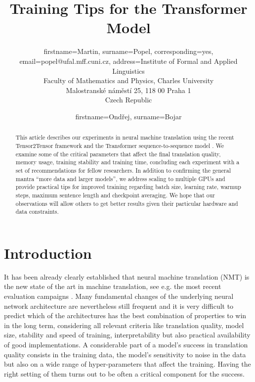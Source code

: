 \documentclass{pbmlarxiv} \pdfoutput=1
\def\parcite#1{\cite{#1}}
\begin{document}
\title{Training Tips for the Transformer Model}

\author{
  firstname=Martin,
  surname=Popel,
  corresponding=yes,
  email={popel@ufal.mff.cuni.cz},
  address={Institute of Formal and Applied Linguistics\\
           Faculty of Mathematics and Physics, Charles University\\
           Malostranské náměstí 25,
           118 00 Praha 1\\
           Czech Republic}
}
\author{firstname=Ondřej, surname=Bojar}

\PBMLmaketitle

\begin{abstract}
This article describes our experiments in neural machine translation
 using the recent Tensor2Tensor framework
 and the Transformer sequence-to-sequence model \citep{vaswani-et-al:2017}. 
We examine some of the critical parameters
 that affect the final translation quality, memory usage, training stability and training time,
 concluding each experiment with a set of recommendations for fellow researchers.
In addition to confirming the general mantra ``more data and larger models'',
 we address scaling to multiple GPUs and provide practical tips for improved training
 regarding batch size, learning rate, warmup steps, maximum sentence length and checkpoint averaging.
We hope that our observations will allow others
 to get better results given their particular hardware and data constraints.
\end{abstract}

\section{Introduction}

It has been already clearly established that neural machine translation (NMT) is
the new state of the art in machine translation, see e.g. the most recent
evaluation campaigns \parcite{bojar-EtAl:2017:WMT1,iwslt:overview:2017}. Many fundamental
changes of the underlying neural network architecture are nevertheless still
frequent and it is very difficult to predict which of the architectures has the
best combination of properties to win in the long term, considering all relevant
criteria like translation quality, model size, stability and speed of
training, interpretability but also practical availability of good
implementations.
A considerable part of a model's success in translation quality
consists in the training data, the model's sensitivity to noise in the data but also on a
wide range of hyper-parameters that affect the training. Having the right
setting of them turns out to be often a critical component for the success.
\end{document}
